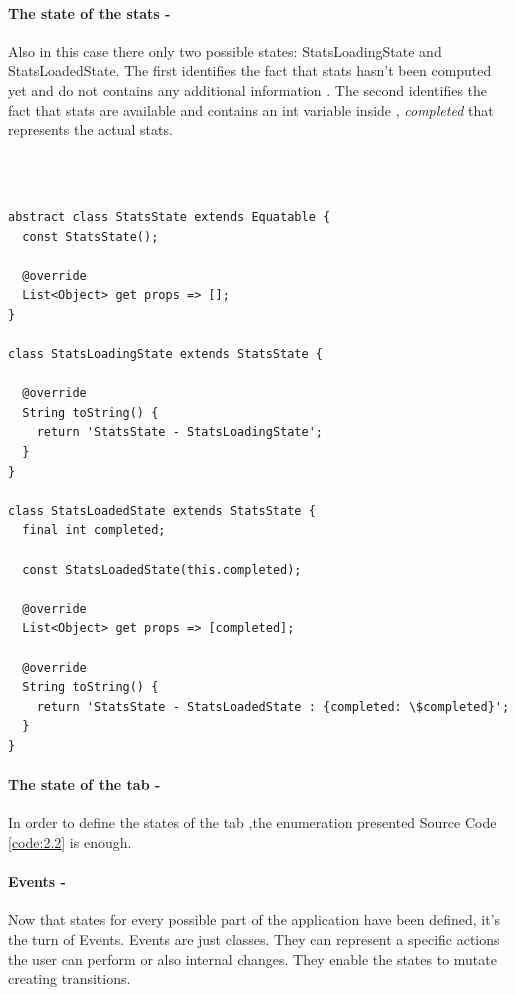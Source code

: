\paragraph{The state of the stats - }
\label{subpar:todo_app_bloc_core_state}
Also in this case there only two possible states:  StatsLoadingState and StatsLoadedState. The first identifies the fact that stats hasn’t been computed yet and do not contains any additional information . The second identifies the fact that stats are available and contains an int variable inside ,  \textit{completed} that represents the actual stats.
\begin{code}
\mbox{}\\
 \mbox{}
\label{code:2.14}
\begin{verbatim}

abstract class StatsState extends Equatable {
  const StatsState();

  @override
  List<Object> get props => [];
}

class StatsLoadingState extends StatsState {

  @override
  String toString() {
    return 'StatsState - StatsLoadingState';
  }
}

class StatsLoadedState extends StatsState {
  final int completed;

  const StatsLoadedState(this.completed);

  @override
  List<Object> get props => [completed];

  @override
  String toString() {
    return 'StatsState - StatsLoadedState : {completed: \$completed}';
  }
}
\end{verbatim}
\mbox{}
\end{code}

\paragraph{The state of the tab - }
\label{subpar:todo_app_bloc_core_state}
In order to define the states of the tab ,the enumeration presented Source Code \ref{code:2.2} is enough.

\paragraph{Events - }
\label{subpar:todo_app_bloc_core_state}

Now that states for every possible part of the application have been defined, it’s the turn of Events. Events are just classes. They can represent a specific actions the user can perform or also internal changes. They enable the states to mutate creating transitions. 


